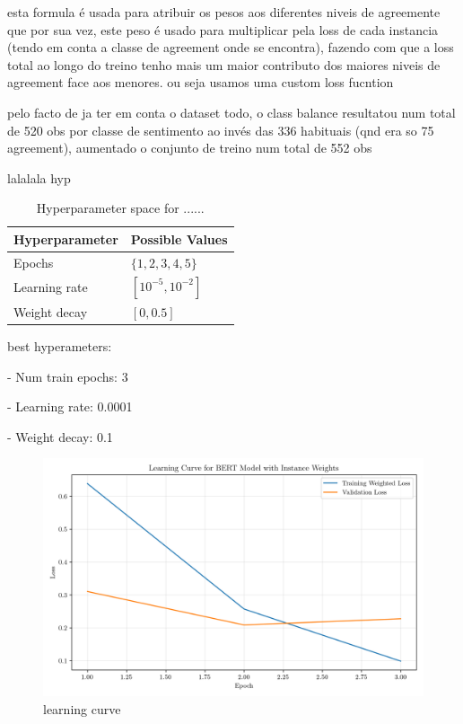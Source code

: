 \documentclass[conference]{IEEEtran}
\begin{document}
esta formula é usada para atribuir os pesos aos diferentes niveis de agreemente que por sua vez, este peso é usado para multiplicar pela loss de cada instancia (tendo em conta a classe de agreement onde se encontra), fazendo com que a loss total ao longo do treino tenho mais um maior contributo dos maiores niveis de agreement face aos menores. ou seja usamos uma custom loss fucntion

pelo facto de ja ter em conta o dataset todo, o class balance resultatou num total de 520 obs por classe de sentimento ao invés das 336 habituais (qnd era so 75 agreement), aumentado o conjunto de treino num total de 552 obs

lalalala hyp

\begin{table}[H]
\centering
\caption{Hyperparameter space for ......}
\label{parameters_basebert}
\begin{tabular}{ll}
\toprule
\textbf{Hyperparameter} & \textbf{Possible Values} \\
\midrule
Epochs & $\{1,2,3,4,5\}$ \\
Learning rate & $[10^{-5}, 10^{-2}]$ \\
Weight decay & $[0, 0.5]$ \\
\bottomrule
\end{tabular}
\end{table}

best hyperameters: 

- Num train epochs: 3

- Learning rate: 0.0001

- Weight decay: 0.1



\begin{figure}[H]
    \centering
    \includegraphics[width=1\linewidth]{assets/weighted_bert_learning_curve.png}
    \caption{learning curve}
    \label{fig:weighted_bert_learning_curve}
\end{figure}
\end{document}
